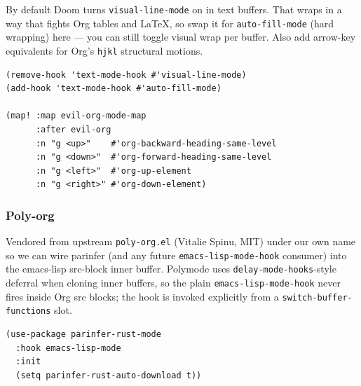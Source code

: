 \documentclass[11pt]{article}
\begin{document}
By default Doom turns \texttt{visual-line-mode} on in text buffers. That
wraps in a way that fights Org tables and \LaTeX{}, so swap it for
\texttt{auto-fill-mode} (hard wrapping) here — you can still toggle visual
wrap per buffer. Also add arrow-key equivalents for Org's \texttt{hjkl}
structural motions.

\begin{verbatim}
(remove-hook 'text-mode-hook #'visual-line-mode)
(add-hook 'text-mode-hook #'auto-fill-mode)

(map! :map evil-org-mode-map
      :after evil-org
      :n "g <up>"    #'org-backward-heading-same-level
      :n "g <down>"  #'org-forward-heading-same-level
      :n "g <left>"  #'org-up-element
      :n "g <right>" #'org-down-element)
\end{verbatim}
\subsubsection{Poly-org}
\label{sec:org8528f4c}
Vendored from upstream \texttt{poly-org.el} (Vitalie Spinu, MIT) under our
own name so we can wire parinfer (and any future \texttt{emacs-lisp-mode-hook}
consumer) into the emacs-lisp src-block inner buffer.  Polymode uses
\texttt{delay-mode-hooks}-style deferral when cloning inner buffers, so the
plain \texttt{emacs-lisp-mode-hook} never fires inside Org src blocks; the
hook is invoked explicitly from a \texttt{switch-buffer-functions} slot.
\begin{verbatim}
(use-package parinfer-rust-mode
  :hook emacs-lisp-mode
  :init
  (setq parinfer-rust-auto-download t))
\end{verbatim}
\end{document}
